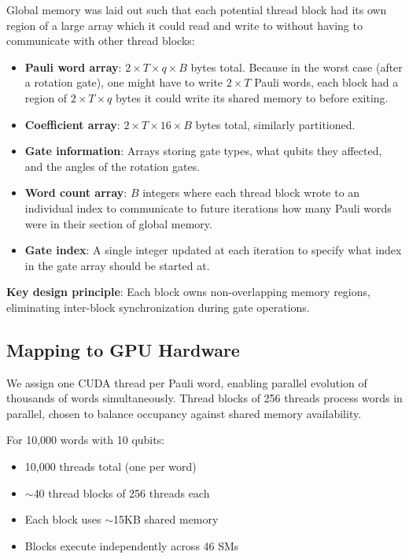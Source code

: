 \documentclass[11pt, a4paper]{article}
\begin{document}
Global memory was laid out such that each potential thread block had its own region of a large array which it could read and write to without having to communicate with other thread blocks:

\begin{itemize}
    \item \textbf{Pauli word array}: $2 \times T \times q \times B$ bytes total. Because in the worst case (after a rotation gate), one might have to write $2 \times T$ Pauli words, each block had a region of $2 \times T \times q$ bytes it could write its shared memory to before exiting.
    \item \textbf{Coefficient array}: $2 \times T \times 16 \times B$ bytes total, similarly partitioned.
    \item \textbf{Gate information}: Arrays storing gate types, what qubits they affected, and the angles of the rotation gates.
    \item \textbf{Word count array}: $B$ integers where each thread block wrote to an individual index to communicate to future iterations how many Pauli words were in their section of global memory.
    \item \textbf{Gate index}: A single integer updated at each iteration to specify what index in the gate array should be started at.
\end{itemize}

\noindent \textbf{Key design principle}: Each block owns non-overlapping memory regions, eliminating inter-block synchronization during gate operations.

\subsection{Mapping to GPU Hardware}

We assign one CUDA thread per Pauli word, enabling parallel evolution of thousands of words simultaneously. Thread blocks of 256 threads process words in parallel, chosen to balance occupancy against shared memory availability.

For 10,000 words with 10 qubits:
\begin{itemize}
    \item 10,000 threads total (one per word)
    \item $\sim$40 thread blocks of 256 threads each
    \item Each block uses $\sim$15KB shared memory
    \item Blocks execute independently across 46 SMs
\end{itemize}
\end{document}
